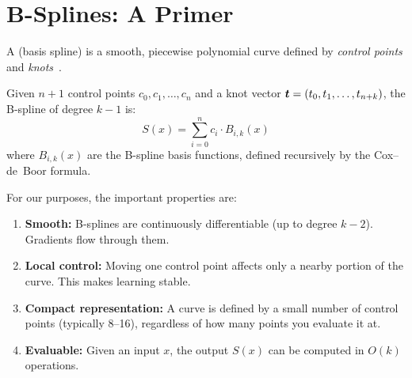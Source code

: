 \section{B-Splines: A Primer}
\label{sec:bsplines}

A  (basis spline) is a smooth, piecewise polynomial
curve defined by \emph{control points} and
\emph{knots}~\cite{deboor1978splines}.

\begin{definition}
Given $n+1$ control points $c_0, c_1, \ldots, c_n$ and a knot vector
$\bm{t} = (t_0, t_1, \ldots, t_{n+k})$, the B-spline of degree
$k{-}1$ is:
\begin{equation}
  S(x) = \sum_{i=0}^{n} c_i \cdot B_{i,k}(x)
  \label{eq:bspline}
\end{equation}
where $B_{i,k}(x)$ are the B-spline basis functions, defined
recursively by the Cox--de~Boor formula.
\end{definition}

For our purposes, the important properties are:

\begin{enumerate}
  \item \textbf{Smooth:} B-splines are continuously differentiable
    (up to degree $k{-}2$). Gradients flow through them.
  \item \textbf{Local control:} Moving one control point affects
    only a nearby portion of the curve. This makes learning stable.
  \item \textbf{Compact representation:} A curve is defined by a
    small number of control points (typically 8--16), regardless of
    how many points you evaluate it at.
  \item \textbf{Evaluable:} Given an input $x$, the output $S(x)$
    can be computed in $O(k)$ operations.
\end{enumerate}

